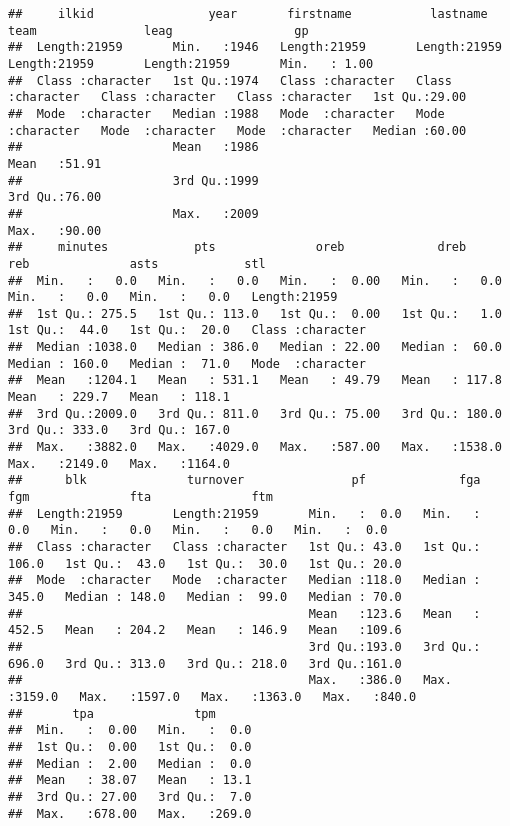 \documentclass[
]{book}
\begin{document}
\begin{verbatim}
##     ilkid                year       firstname           lastname             team               leag                 gp       
##  Length:21959       Min.   :1946   Length:21959       Length:21959       Length:21959       Length:21959       Min.   : 1.00  
##  Class :character   1st Qu.:1974   Class :character   Class :character   Class :character   Class :character   1st Qu.:29.00  
##  Mode  :character   Median :1988   Mode  :character   Mode  :character   Mode  :character   Mode  :character   Median :60.00  
##                     Mean   :1986                                                                               Mean   :51.91  
##                     3rd Qu.:1999                                                                               3rd Qu.:76.00  
##                     Max.   :2009                                                                               Max.   :90.00  
##     minutes            pts              oreb             dreb             reb              asts            stl           
##  Min.   :   0.0   Min.   :   0.0   Min.   :  0.00   Min.   :   0.0   Min.   :   0.0   Min.   :   0.0   Length:21959      
##  1st Qu.: 275.5   1st Qu.: 113.0   1st Qu.:  0.00   1st Qu.:   1.0   1st Qu.:  44.0   1st Qu.:  20.0   Class :character  
##  Median :1038.0   Median : 386.0   Median : 22.00   Median :  60.0   Median : 160.0   Median :  71.0   Mode  :character  
##  Mean   :1204.1   Mean   : 531.1   Mean   : 49.79   Mean   : 117.8   Mean   : 229.7   Mean   : 118.1                     
##  3rd Qu.:2009.0   3rd Qu.: 811.0   3rd Qu.: 75.00   3rd Qu.: 180.0   3rd Qu.: 333.0   3rd Qu.: 167.0                     
##  Max.   :3882.0   Max.   :4029.0   Max.   :587.00   Max.   :1538.0   Max.   :2149.0   Max.   :1164.0                     
##      blk              turnover               pf             fga              fgm              fta              ftm       
##  Length:21959       Length:21959       Min.   :  0.0   Min.   :   0.0   Min.   :   0.0   Min.   :   0.0   Min.   :  0.0  
##  Class :character   Class :character   1st Qu.: 43.0   1st Qu.: 106.0   1st Qu.:  43.0   1st Qu.:  30.0   1st Qu.: 20.0  
##  Mode  :character   Mode  :character   Median :118.0   Median : 345.0   Median : 148.0   Median :  99.0   Median : 70.0  
##                                        Mean   :123.6   Mean   : 452.5   Mean   : 204.2   Mean   : 146.9   Mean   :109.6  
##                                        3rd Qu.:193.0   3rd Qu.: 696.0   3rd Qu.: 313.0   3rd Qu.: 218.0   3rd Qu.:161.0  
##                                        Max.   :386.0   Max.   :3159.0   Max.   :1597.0   Max.   :1363.0   Max.   :840.0  
##       tpa              tpm       
##  Min.   :  0.00   Min.   :  0.0  
##  1st Qu.:  0.00   1st Qu.:  0.0  
##  Median :  2.00   Median :  0.0  
##  Mean   : 38.07   Mean   : 13.1  
##  3rd Qu.: 27.00   3rd Qu.:  7.0  
##  Max.   :678.00   Max.   :269.0
\end{verbatim}
\end{document}
